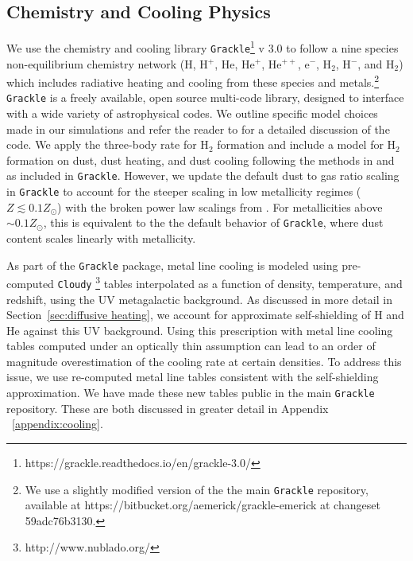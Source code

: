 \documentclass[twocolumn]{aastex61}
\begin{document}
\subsection{Chemistry and Cooling Physics}
\label{sec:chemistry}

We use the chemistry and cooling library \texttt{Grackle}\footnote{https://grackle.readthedocs.io/en/grackle-3.0/} v 3.0 to follow a nine species non-equilibrium chemistry network (H, H$^+$, He, He$^+$, He$^{++}$, e$^{-}$, H$_2$, H$^{-}$, and H$_{2}$) which includes radiative heating and cooling from these species and metals.\footnote{We use a slightly modified version of the the main \texttt{Grackle} repository, available at https://bitbucket.org/aemerick/grackle-emerick at changeset 59adc76b3130.} \texttt{Grackle} is a freely available, open source multi-code library, designed to interface with a wide variety of astrophysical codes. We outline specific model choices made in our simulations and refer the reader to \citet{GrackleMethod} for a detailed discussion of the code. We apply the \citet{Glover2008} three-body rate for H$_{2}$ formation and include a model for H$_2$ formation on dust, dust heating, and dust cooling following the methods in \citet{2000ApJ...534..809O} and \citet{2005ApJ...626..627O} as included in \texttt{Grackle}. However, we update the default dust to gas ratio scaling in \texttt{Grackle} to account for the steeper scaling in low metallicity regimes ($Z \lesssim 0.1 Z_{\odot}$) with the broken power law scalings from \citet{Remy-Ruyer2014}. For metallicities above $\sim 0.1 Z_{\odot}$, this is equivalent to the the default behavior of \texttt{Grackle}, where dust content scales linearly with metallicity.

As part of the \texttt{Grackle} package, metal line cooling is modeled using pre-computed \texttt{Cloudy} \citep{Cloudy2013} \footnote{http://www.nublado.org/} tables interpolated as a function of density, temperature, and redshift, using the \citet{HM2012} UV metagalactic background. As discussed in more detail in Section~\ref{sec:diffusive heating}, we account for approximate self-shielding of H and He against this UV background. Using this prescription with metal line cooling tables computed under an optically thin assumption can lead to an order of magnitude overestimation of the cooling rate at certain densities. To address this issue, we use re-computed metal line tables consistent with the self-shielding approximation.  We have made these new tables public in the main \texttt{Grackle} repository. These are both discussed in greater detail in Appendix ~\ref{appendix:cooling}.
\end{document}
